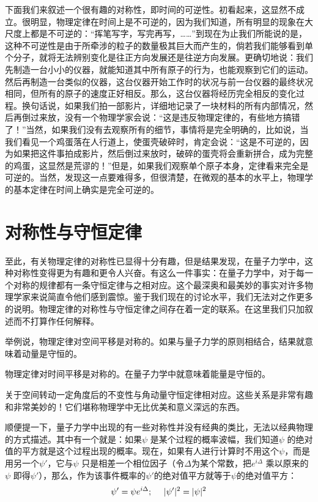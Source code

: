 下面我们来叙述一个很有趣的对称性，即时间的可逆性。初看起来，这显然不成立。很明显，物理定律在时间上是不可逆的，因为我们知道，所有明显的现象在大尺度上都是不可逆的：“挥笔写字，写完再写，……”到现在为止我们所能说的是，这种不可逆性是由于所牵涉的粒子的数量极其巨大而产生的，倘若我们能够看到单个分子，就将无法辨别变化是往正方向发展还是往逆方向发展。更确切地说：我们先制造一台小小的仪器，就能知道其中所有原子的行为，也能观察到它们的运动。然后再制造一台类似的仪器，这台仪器开始工作时的状况与前一台仪器的最终状况相同，但所有的原子的速度正好相反。那么，这台仪器将经历完全相反的变化过程。换句话说，如果我们拍一部影片，详细地记录了一块材料的所有内部情况，然后再倒过来放，没有一个物理学家会说：“这是违反物理定律的，有些地方搞错了！”当然，如果我们没有去观察所有的细节，事情将是完全明确的，比如说，当我们看见一个鸡蛋落在人行道上，使蛋壳破碎时，肯定会说：“这是不可逆的，因为如果把这件事拍成影片，然后倒过来放时，破碎的蛋壳将会重新拼合，成为完整的鸡蛋，这显然是荒谬的！”但是，如果我们观察单个原子本身，定律看来完全是可逆的。当然，发现这一点要难得多，但很清楚，在微观的基本的水平上，物理学的基本定律在时间上确实是完全可逆的。

\section{对称性与守恒定律}

至此，有关物理定律的对称性已显得十分有趣，但是结果发现，在量子力学中，这种对称性变得更为有趣和更令人兴奋。有这么一件事实：在量子力学中，对于每一个对称的规律都有一条守恒定律与之相对应。这个最深奥和最美妙的事实对许多物理学家来说简直令他们感到震惊。鉴于我们现在的讨论水平，我们无法对之作更多的说明。物理定律的对称性与守恒定律之间存在着一定的联系。在这里我们只加叙述而不打算作任何解释。

举例说，物理定律对空间平移是对称的。如果与量子力学的原则相结合，结果就意味着动量是守恒的。

物理定律对时间平移是对称的。在量子力学中就意味着能量是守恒的。

关于空间转动一定角度后的不变性与角动量守恒定律相对应。这些关系是非常有趣和非常美妙的！它们堪称物理学中无比优美和意义深远的东西。

顺便提一下，量子力学中出现的有一些对称性并没有经典的类比，无法以经典物理的方式描述。其中有一个就是：如果$\psi$ 是某个过程的概率波幅，我们知道$\psi$ 的绝对值的平方就是这个过程出现的概率。现在，如果有人进行计算时不用这个$\psi$，而是用另一个$\psi'$，它与$\psi$ 只是相差一个相位因子（令$\Delta$为某个常数，把$e^{i\Delta}$ 乘以原来的$\psi$ 即得$\psi'$），那么，作为该事件概率的$\psi'$的绝对值平方就等于$\psi$的绝对值平方：
\begin{equation*}
    \psi' = \psi e^{i\Delta}; ~~~~ \lvert\psi'\rvert^2 = \lvert\psi\rvert^2
\end{equation*}

